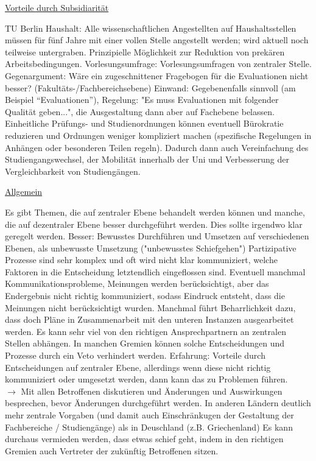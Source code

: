     \underline{Vorteile durch Subsidiarität}
      \begin{outline}
        \1 TU Berlin Haushalt: Alle wissenschaftlichen Angestellten auf Haushaltsstellen müssen für fünf Jahre mit einer vollen Stelle angestellt werden; wird aktuell noch teilweise untergraben. Prinzipielle Möglichkeit zur Reduktion von prekären Arbeitsbedingungen.
        \1 Vorlesungsumfrage: Vorlesungsumfragen von zentraler Stelle.
          \2 Gegenargument: Wäre ein zugeschnittener Fragebogen für die Evaluationen nicht besser? (Fakultäts-/Fachbereichsebene)
          \2 Einwand: Gegebenenfalls sinnvoll (am Beispiel ``Evaluationen''), Regelung: "Es muss Evaluationen mit folgender Qualität geben...", die Ausgestaltung dann aber auf Fachebene belassen.
          \2 Einheitliche Prüfungs- und Studienordnungen können eventuell Bürokratie reduzieren und Ordnungen weniger kompliziert machen (spezifische Regelungen in Anhängen oder besonderen Teilen regeln). Dadurch dann auch Vereinfachung des Studiengangswechsel, der Mobilität innerhalb der Uni und Verbesserung der Vergleichbarkeit von Studiengängen.
      \end{outline}

    \underline{Allgemein}
      \begin{outline}
        \1 Es gibt Themen, die auf zentraler Ebene behandelt werden können und manche, die auf dezentraler Ebene besser durchgeführt werden. Dies sollte irgendwo klar geregelt werden.
        \1 Besser: Bewusstes Durchführen und Umsetzen auf verschiedenen Ebenen, als unbewusste Umsetzung ("unbewusstes Schiefgehen")
        \1 Partizipative Prozesse sind sehr komplex und oft wird nicht klar kommuniziert, welche Faktoren in die Entscheidung letztendlich eingeflossen sind.
        \1 Eventuell manchmal Kommunikationsprobleme, Meinungen werden berücksichtigt, aber das Endergebnis nicht richtig kommuniziert, sodass Eindruck entsteht, dass die Meinungen nicht berücksichtigt wurden.
        \1 Manchmal führt Beharrlichkeit dazu, dass doch Pläne in Zusammenarbeit mit den unteren Instanzen ausgearbeitet werden.
        \1 Es kann sehr viel von den richtigen Ansprechpartnern an zentralen Stellen abhängen.
        \1 In manchen Gremien können solche Entscheidungen und Prozesse durch ein Veto verhindert werden.
        \1 Erfahrung: Vorteile durch Entscheidungen auf zentraler Ebene, allerdings wenn diese nicht richtig kommuniziert oder umgesetzt werden, dann kann das zu Problemen führen. \\ $\rightarrow$ Mit allen Betroffenen diskutieren und Änderungen und Auswirkungen besprechen, bevor Änderungen durchgeführt werden.
        \1 In anderen Ländern deutlich mehr zentrale Vorgaben (und damit auch Einschränkugen der Gestaltung der Fachbereiche / Studiengänge) als in Deuschland (z.B. Griechenland)
        \1 Es kann durchaus vermieden werden, dass etwas schief geht, indem in den richtigen Gremien auch Vertreter der zukünftig Betroffenen sitzen.
      \end{outline}


